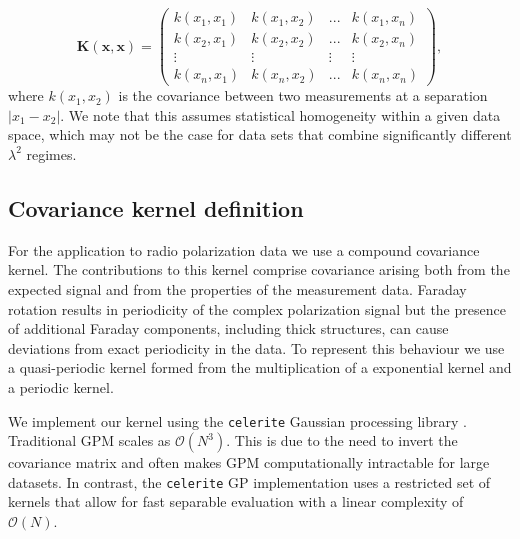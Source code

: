 \documentclass[fleqn,usenatbib]{mnras}
\begin{document}
\begin{equation}
\mathbf{K}(\mathbf{x},\mathbf{x}) = \left(
\begin{array}{cccc}
k(x_1,x_1) & k(x_1,x_2) & ... & k(x_1,x_n) \\
k(x_2,x_1) & k(x_2,x_2) & ... & k(x_2,x_n) \\
\vdots & \vdots & \vdots & \vdots \\
k(x_n,x_1) & k(x_n,x_2) & ... & k(x_n,x_n)
\end{array}
\right),
\end{equation}
%
where $k(x_1,x_2)$ is the covariance between two measurements at a separation $|x_1 - x_2|$. We note that this assumes statistical homogeneity within a given data space, which may not be the case for data sets that combine significantly different $\lambda^2$ regimes.

%
%


\subsection{Covariance kernel definition}
\label{sec:kernels}

For the application to radio polarization data we use a compound covariance kernel. The contributions to this kernel comprise covariance arising both from the expected signal and from the properties of the measurement data. Faraday rotation results in periodicity of the complex polarization signal but the presence of additional Faraday components, including thick structures, can cause deviations from exact periodicity in the data. To represent this behaviour we use a quasi-periodic kernel formed from the multiplication of a exponential kernel and a periodic kernel.

We implement our kernel using the {\tt celerite} Gaussian processing library \citep{celerite}. Traditional GPM scales as $\mathcal{O}(N^3)$. This is due to the need to invert the covariance matrix and often makes GPM computationally intractable for large datasets. In contrast,  the {\tt celerite} GP implementation uses a restricted set of kernels that allow for fast separable evaluation with a linear complexity of $\mathcal{O}(N)$.
\end{document}
